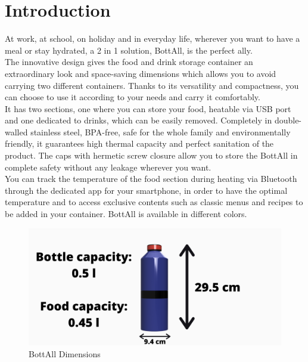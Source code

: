 \section{Introduction}
At work, at school, on holiday and in everyday life, wherever you want to have a meal or stay hydrated, a 2 in 1 solution, BottAll, is the perfect ally.\\
The innovative design gives the food and drink storage container an extraordinary look and space-saving dimensions which allows you to avoid carrying two different containers. Thanks to its versatility and compactness, you can choose to use it according to your needs and carry it comfortably.\\
 It has two sections, one where you can store your food, heatable via USB port and one dedicated to drinks, which can be easily removed. Completely in double-walled stainless steel, BPA-free, safe for the whole family and environmentally friendly, it guarantees high thermal capacity and perfect sanitation of the product. The caps with hermetic screw closure allow you to store the BottAll in complete safety without any leakage wherever you want. \\
You can track the temperature of the food section during heating via Bluetooth through the dedicated app for your smartphone, in order to have the optimal temperature and to access exclusive contents such as classic menus and recipes to be added in your container. BottAll is available in different colors.
\begin{figure}[H]
\centering
\includegraphics[width=1\textwidth]{images/bottle dimension.png}
\caption{BottAll Dimensions}
\end{figure}